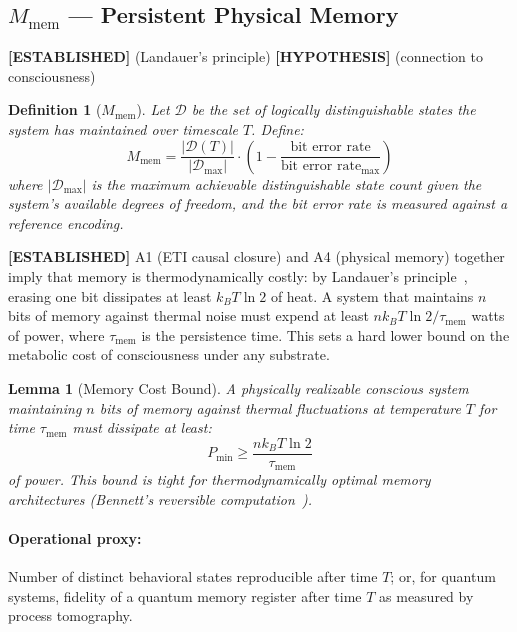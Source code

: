 \documentclass[12pt,letterpaper]{article}
\newtheorem{definition}{Definition}[section]
\newtheorem{lemma}{Lemma}[section]
\newcommand{\ESTABLISHED}[1]{\textcolor{green!50!black}{\textbf{[ESTABLISHED]}} #1}
\newcommand{\HYPOTHESIS}[1]{\textcolor{blue!70!black}{\textbf{[HYPOTHESIS]}} #1}
\newcommand{\Mmem}{M_{\mathrm{mem}}}
\begin{document}
\subsection{\texorpdfstring{$\Mmem$ — Persistent Physical Memory}{Mmem — Persistent Physical Memory}}
\label{sec:Mmem}

\ESTABLISHED{} (Landauer's principle) \HYPOTHESIS{} (connection to consciousness)

\begin{definition}[$\Mmem$]
Let $\mathcal{D}$ be the set of logically distinguishable states the system
has maintained over timescale $T$. Define:
\begin{equation}
  \Mmem = \frac{|\mathcal{D}(T)|}{|\mathcal{D}_{\max}|} \cdot
    \left(1 - \frac{\text{bit error rate}}{\text{bit error rate}_{\max}}\right)
  \label{eq:Mmem}
\end{equation}
where $|\mathcal{D}_{\max}|$ is the maximum achievable distinguishable state
count given the system's available degrees of freedom, and the bit error rate
is measured against a reference encoding.
\end{definition}

\ESTABLISHED{} A1 (ETI causal closure) and A4 (physical memory) together imply
that memory is thermodynamically costly: by Landauer's principle~\cite{Landauer1961},
erasing one bit dissipates at least $k_B T \ln 2$ of heat. A system that
maintains $n$ bits of memory against thermal noise must expend at least
$n k_B T \ln 2 / \tau_{\mathrm{mem}}$ watts of power, where
$\tau_{\mathrm{mem}}$ is the persistence time. This sets a hard lower bound
on the metabolic cost of consciousness under any substrate.

\begin{lemma}[Memory Cost Bound]
\label{lem:memory_cost}
A physically realizable conscious system maintaining $n$ bits of memory
against thermal fluctuations at temperature $T$ for time $\tau_{\mathrm{mem}}$
must dissipate at least:
\begin{equation}
  P_{\min} \geq \frac{n k_B T \ln 2}{\tau_{\mathrm{mem}}}
  \label{eq:memory_cost}
\end{equation}
of power. This bound is tight for thermodynamically optimal memory
architectures (Bennett's reversible computation~\cite{Bennett1973}).
\end{lemma}

\paragraph{Operational proxy:} Number of distinct behavioral states
reproducible after time $T$; or, for quantum systems, fidelity of a
quantum memory register after time $T$ as measured by process tomography.
\end{document}
